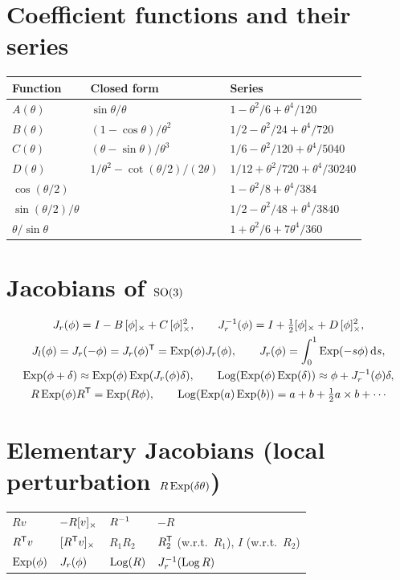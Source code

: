 \section*{Coefficient functions and their series}
\begin{center}\small
\begin{tabular}{@{}l l l@{}}
\toprule
Function & Closed form & Series \\
\midrule
$A(\theta)$ & $\sin\theta/\theta$ & $1 - \theta^2/6 + \theta^4/120$ \\
$B(\theta)$ & $(1 - \cos\theta)/\theta^2$ & $1/2 - \theta^2/24 + \theta^4/720$ \\
$C(\theta)$ & $(\theta - \sin\theta)/\theta^3$ & $1/6 - \theta^2/120 + \theta^4/5040$ \\
$D(\theta)$ & $1/\theta^2 - \cot(\theta/2)/(2\theta)$ & $1/12 + \theta^2/720 + \theta^4/30240$ \\
$\cos(\theta/2)$ & & $1 - \theta^2/8 + \theta^4/384$ \\
$\sin(\theta/2)/\theta$ & & $1/2 - \theta^2/48 + \theta^4/3840$ \\
$\theta/\sin\theta$ & & $1 + \theta^2/6 + 7\theta^4/360$ \\
\bottomrule
\end{tabular}
\end{center}

\section*{Jacobians of \texorpdfstring{$\mathrm{SO}(3)$}{SO(3)}}
\begin{gather*}
  J_r(\phi) = I - B\,[\phi]_{\times} + C\,[\phi]_{\times}^2, \qquad J_r^{-1}(\phi) = I + \tfrac12[\phi]_{\times} + D\,[\phi]_{\times}^2, \\
  J_l(\phi) = J_r(-\phi) = J_r(\phi)^{\mathsf{T}} = \operatorname{Exp}(\phi)J_r(\phi), \qquad J_r(\phi) = \int_0^1\operatorname{Exp}(-s\phi)\,\mathrm{d} s, \\
  \operatorname{Exp}(\phi + \delta) \approx \operatorname{Exp}(\phi)\operatorname{Exp}(J_r(\phi)\delta), \qquad
  \operatorname{Log}(\operatorname{Exp}(\phi)\operatorname{Exp}(\delta)) \approx \phi + J_r^{-1}(\phi)\delta, \\
  R\operatorname{Exp}(\phi)R^{\mathsf{T}} = \operatorname{Exp}(R\phi), \qquad \operatorname{Log}(\operatorname{Exp}(a)\operatorname{Exp}(b)) = a + b + \tfrac12 a\times b + \cdots
\end{gather*}

\section*{Elementary Jacobians (local perturbation \texorpdfstring{$R\operatorname{Exp}(\delta\theta)$}{R Exp(dtheta)})}
\begin{center}\small
\begin{tabular}{@{}l l@{\qquad}l l@{}}
\toprule
$Rv$ & $-R[v]_{\times}$ & $R^{-1}$ & $-R$ \\
$R^{\mathsf{T}} v$ & $[R^{\mathsf{T}} v]_{\times}$ & $R_1R_2$ & $R_2^{\mathsf{T}}$ (w.r.t.\ $R_1$), $I$ (w.r.t.\ $R_2$) \\
$\operatorname{Exp}(\phi)$ & $J_r(\phi)$ & $\operatorname{Log}(R)$ & $J_r^{-1}(\operatorname{Log} R)$ \\
\bottomrule
\end{tabular}
\end{center}

